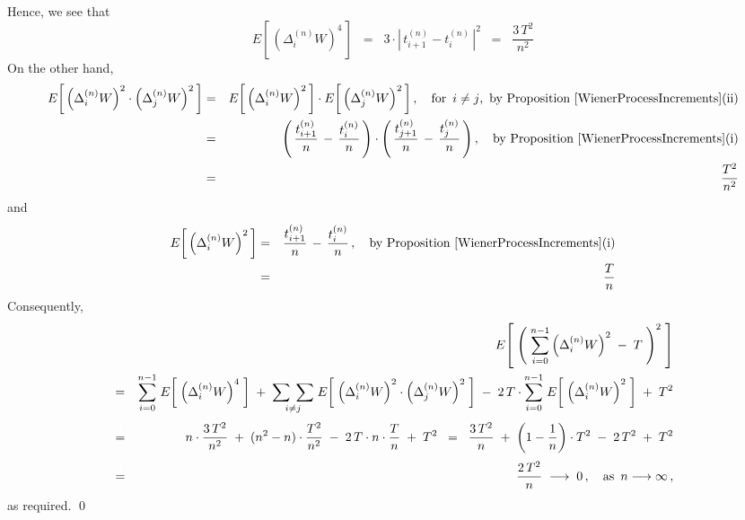 Hence, we see that
\begin{equation*}
E\!\left[\,\left(\Delta^{(n)}_{i}W\right)^{4}\,\right]
\;\; = \;\;
	3\cdot\left\vert\,t^{(n)}_{i+1} - t^{(n)}_{i}\,\right\vert^{2}
\;\; = \;\;
	\dfrac{3\,T^{2}}{n^{2}}
\end{equation*}
On the other hand,
\begin{eqnarray*}
E\!\left[\, \left(\Delta^{(n)}_{i}W\right)^{2} \cdot \left(\Delta^{(n)}_{j}W\right)^{2} \,\right]
& = &
	E\!\left[\, \left(\Delta^{(n)}_{i}W\right)^{2} \,\right]
	\cdot
	E\!\left[\, \left(\Delta^{(n)}_{j}W\right)^{2} \,\right],
	\quad
	\textnormal{for \,$i \neq j$,\, by Proposition \ref{WienerProcessIncrements}(ii)}
\\
& = &
	\left(\,\dfrac{t^{(n)}_{i+1}}{n} \,-\, \dfrac{t^{(n)}_{i}}{n}\,\right)
	\cdot
	\left(\,\dfrac{t^{(n)}_{j+1}}{n} \,-\, \dfrac{t^{(n)}_{j}}{n}\,\right),
	\quad
	\textnormal{by Proposition \ref{WienerProcessIncrements}(i)}
\\
& = &
	\dfrac{T^{2}}{n^{2}}
\end{eqnarray*}
and
\begin{eqnarray*}
E\!\left[\, \left(\Delta^{(n)}_{i}W\right)^{2} \,\right]
& = &
	\dfrac{t^{(n)}_{i+1}}{n} \,-\, \dfrac{t^{(n)}_{i}}{n}\,,
	\quad
	\textnormal{by Proposition \ref{WienerProcessIncrements}(i)}
\\
& = &
	\dfrac{T}{n}
\end{eqnarray*}
Consequently,
\begin{eqnarray*}
&&
	E\!\left[\; \left(\;\overset{n-1}{\underset{i=0}{\sum}} \left(\Delta^{(n)}_{i}W\right)^{2} \; - \; T\;\right)^{2} \;\right]
\\
& = &
	\overset{n-1}{\underset{i=0}{\sum}}\;
		E\!\left[\;\left(\Delta^{(n)}_{i}W\right)^{4}\;\right]
	\; + \;
		\underset{i \neq j}{\sum\;\sum}\;
		E\!\left[\;\left(\Delta^{(n)}_{i}W\right)^{2} \cdot \left(\Delta^{(n)}_{j}W\right)^{2}\;\right]
	\; - \;
		2\,T \cdot \overset{n-1}{\underset{i=0}{\sum}}\; E\!\left[\; \left(\Delta^{(n)}_{i}W\right)^{2} \;\right]
	\; + \;
		T^{2}
\\
& \overset{{\color{white}\textnormal{\LARGE$1$}}}{=} &
	n \cdot \dfrac{3\,T^{2}}{n^{2}}
	\; + \;
	(n^{2}-n) \cdot \dfrac{T^{2}}{n^{2}}
	\; - \;
	2\,T \cdot n \cdot \dfrac{T}{n}
	\; + \;
	T^{2}
\;\; = \;\;
	\dfrac{3\,T^{2}}{n}
	\; + \;
	\left(1-\dfrac{1}{n}\right) \cdot T^{2}
	\; - \;
	2\,T^{2}
	\; + \;
	T^{2}
\\
& \overset{{\color{white}\textnormal{\LARGE$1$}}}{=} &
	\dfrac{2\,T^{2}}{n}
	\;\longrightarrow\; 0\,,
	\quad
	\textnormal{as \,$n \longrightarrow \infty$}\,,
\end{eqnarray*}
as required.
\qed

